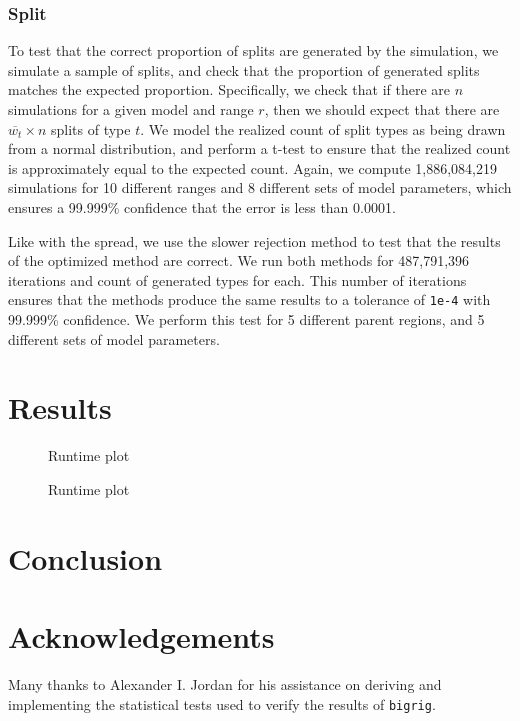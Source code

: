 \documentclass[a4paper]{article}
\newcommand{\bigrig}{\texttt{bigrig}}
\begin{document}
\subsubsection{Split}

To test that the correct proportion of splits are generated by the simulation,
we simulate a sample of splits, and check that the proportion of generated
splits matches the expected proportion.
Specifically, we check that if there are \(n\) simulations for a given model
and range \( r \), then we should expect that there are \(\overline{w_t} \times
n\) splits of type \( t \).
We model the realized count of split types as being drawn from a normal
distribution, and perform a t-test to ensure that the realized count is
approximately equal to the expected count.
Again, we compute 1,886,084,219 simulations for 10 different ranges and 8
different sets of model parameters, which ensures a 99.999\% confidence that
the error is less than 0.0001.

Like with the spread, we use the slower rejection method to test that the
results of the optimized method are correct.
We run both methods for 487,791,396 iterations and count of generated types for
each.
This number of iterations ensures that the methods produce the same results to
a tolerance of \texttt{1e-4} with 99.999\% confidence.
We perform this test for 5 different parent regions, and 5 different sets of
model parameters.

\section{Results}

\begin{figure}
    \centering
    
    \caption{Runtime plot}\label{fig:runtime-taxa}
\end{figure}

\begin{figure}
    \centering
    
    \caption{Runtime plot}\label{fig:runtime-regions}
\end{figure}

\section{Conclusion}

\section{Acknowledgements}

Many thanks to Alexander I. Jordan for his assistance on deriving and
implementing the statistical tests used to verify the results of \bigrig{}.


\end{document}
